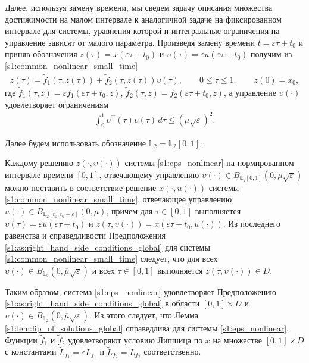\documentclass[../main.tex]{subfiles}
\begin{document}
 
Далее, используя замену времени, мы сведем задачу описания множества достижимости на малом интервале к аналогичной задаче на фиксированном интервале для системы, уравнения которой и интегральные ограничения на управление зависят от малого параметра.
Произведя замену времени $ t = \varepsilon \tau + t_0 $ и приняв обозначения $ z(\tau) = x(\varepsilon \tau + t_0) $ и $ \upsilon(\tau) = \varepsilon u(\varepsilon \tau + t_0) $ получим из \eqref{s1:common_nonlinear_small_time}
\begin{gather}\label{s1:eps_nonlinear}
 \dot{z}(\tau)=\widetilde{f}_1(\tau,z(\tau))+\widetilde{f}_2(\tau,z(\tau))\upsilon(\tau), \qquad 0 \leqslant \tau \leqslant 1, \qquad z(0) = x_0,
\end{gather}
где $ \widetilde{f}_1(\tau,z) = \varepsilon f_1(\varepsilon \tau + t_0,z) $, $ \widetilde{f}_2 (\tau,z) = f_2(\varepsilon \tau + t_0,z)$, а управление $ \upsilon(\cdot) $ удовлетворяет ограничениям
\begin{gather*}%
 \int_0^1 \upsilon^{\top}(\tau) \upsilon(\tau) \, d\tau \leqslant \left( \mu \sqrt{\varepsilon}\right)^2.
\end{gather*}

Далее будем использовать обозначение $\mathbb{L}_2 = \mathbb{L}_2[0, 1]$. 

Каждому решению $z(\cdot, \upsilon(\cdot))$ системы \eqref{s1:eps_nonlinear} на нормированном интервале времени $[0, 1]$, отвечающему управлению $\upsilon(\cdot) \in B_{\mathbb{L}_2[0, 1]} (0, \overline{\mu} \sqrt{\varepsilon})$ можно поставить в соответствие решение $x(\cdot, u(\cdot))$ системы \eqref{s1:common_nonlinear_small_time}, отвечающее управлению $u(\cdot) \in B_{\mathbb{L}_2[t_0, t_0 + \varepsilon]} (0, \overline{\mu})$, причем для $\tau \in [0, 1] $ выполняется $ \upsilon(\tau) = \varepsilon u(\varepsilon \tau + t_0)$ и $ z(\tau, \upsilon(\cdot)) = x(\varepsilon \tau + t_0, u(\cdot)) $.
Из последнего равенства и справедливости Предположения \ref{s1:as:right_hand_side_conditions_global} для системы \eqref{s1:common_nonlinear_small_time} следует, что для всех $\upsilon(\cdot) \in B_{\mathbb{L}_2}(0, \overline{\mu}\sqrt{\varepsilon})$ и всех $\tau \in [0, 1] $ выполняется $z(\tau, \upsilon(\cdot)) \in D$. 

Таким образом, система \eqref{s1:eps_nonlinear} удовлетворяет Предположению \ref{s1:as:right_hand_side_conditions_global} в области $[0, 1]\times D$ и $\upsilon(\cdot) \in B_{\mathbb{L}_2}(0, \overline{\mu}\sqrt{\varepsilon}) $.
Из этого следует, что Лемма \ref{s1:lem:lip_of_solutions_global} справедлива для системы \eqref{s1:eps_nonlinear}.
Функции $\widetilde{f}_1$ и $\widetilde{f}_2$ удовлетворяют условию Липшица по $x$ на множестве $[0, 1]\times D$ с константами $\widetilde{L}_{f_1} = \varepsilon L_{f_1} $ и $\widetilde{L}_{f_2} = L_{f_2} $ соответственно. 
\end{document}
